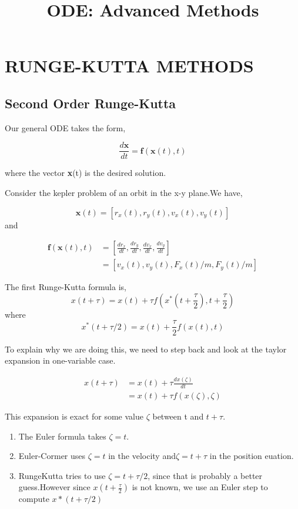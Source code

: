 \documentclass[10pt,a4paper]{article}
\title{ODE: Advanced Methods}
\begin{document}
\maketitle

\section*{RUNGE-KUTTA METHODS}

\subsection*{Second Order Runge-Kutta}

Our general ODE takes the form,

\begin{equation}\label{eq1}
\frac{d\textbf{x}}{dt}=\textbf{f}(\textbf{x}(t),t)
\end{equation}

where the vector \textbf{x}(t) is the desired solution.

Consider the kepler problem of an orbit in the x-y plane.We have,

$$\textbf{x}(t)=[r_x(t),r_y(t),v_x(t),v_y(t)]$$
and

\begin{align*}
\textbf{f}(\textbf{x}(t),t)&=\left[ \frac{d r_{x}}{dt},\frac{d r_{y}}{dt},\frac{d v_{x}}{dt},\frac{d v_y}{dt}\right]\\
&=\left[v_x (t), v_y (t), F_x(t)/m,F_y(t)/m \right]
\end{align*}


The first Runge-Kutta formula is,
\begin{equation}
x(t+\tau) = x(t) + \tau f\left(x^*\left(t+\frac{\tau}{2}\right),t+\frac{\tau}{2}\right)
\end{equation}
where
$$ x^*(t+\tau/2) = x(t) + \frac{\tau}{2}f(x(t),t)$$

To explain why we are doing this, we need to step back and look at the taylor expansion in one-variable case.

\begin{align*}
x(t+\tau)&=x(t) + \tau\frac{d x(\zeta)}{dt}\\
&=x(t) + \tau f(x(\zeta),\zeta)
\end{align*}

This expansion is exact for some value $\zeta$ between t and $t+\tau$.\\
\begin{enumerate}
\item The Euler formula takes $\zeta=t$.
\item Euler-Cormer uses $\zeta=t$ in the velocity and$\zeta=t+\tau$ in the position euation.
\item RungeKutta tries to use $ \zeta=t+\tau/2 $, since that is probably a better guess.However since $x(t+\frac{\tau}{2})$ is not known, we use an Euler step to compute $x*(t+\tau/2)$
\end{enumerate}
\end{document}
